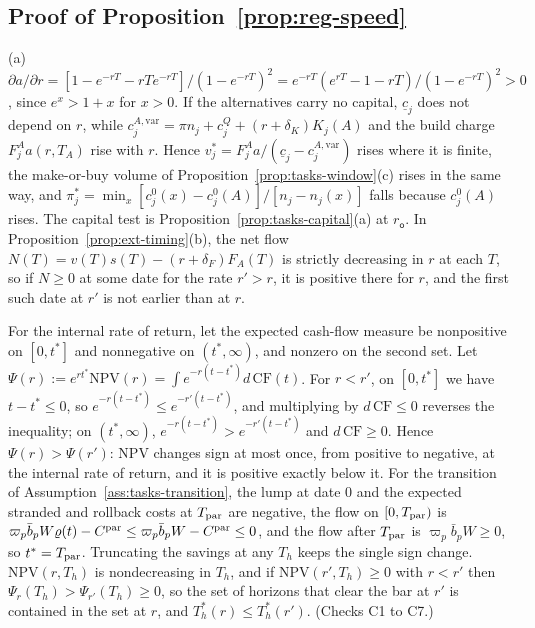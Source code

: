 \subsection*{Proof of Proposition~\ref{prop:reg-speed}}

(a) $\partial a/\partial r=[1-e^{-rT}-rTe^{-rT}]/(1-e^{-rT})^2=e^{-rT}(e^{rT}-1-rT)/(1-e^{-rT})^2>0$, since $e^x>1+x$ for $x>0$. If the alternatives carry no capital, $\underline c_j$ does not depend on $r$, while $c^{A,\mathrm{var}}_j=\pi n_j+c^Q_j+(r+\delta_K)K_j(A)$ and the build charge $F^A_ja(r,T_A)$ rise with $r$. Hence $v^*_j=F^A_ja/(\underline c_j-c^{A,\mathrm{var}}_j)$ rises where it is finite, the make-or-buy volume of Proposition~\ref{prop:tasks-window}(c) rises in the same way, and $\pi^*_j=\min_x[c^0_j(x)-c^0_j(A)]/[n_j-n_j(x)]$ falls because $c^0_j(A)$ rises. The capital test is Proposition~\ref{prop:tasks-capital}(a) at $r_{\mathsf o}$. In Proposition~\ref{prop:ext-timing}(b), the net flow $N(T)=v(T)s(T)-(r+\delta_F)F_A(T)$ is strictly decreasing in $r$ at each $T$, so if $N\ge0$ at some date for the rate $r'>r$, it is positive there for $r$, and the first such date at $r'$ is not earlier than at $r$.

For the internal rate of return, let the expected cash-flow measure be nonpositive on $[0,t^*]$ and nonnegative on $(t^*,\infty)$, and nonzero on the second set. Let $\Psi(r):=e^{rt^*}\mathrm{NPV}(r)=\int e^{-r(t-t^*)}d\,\mathrm{CF}(t)$. For $r<r'$, on $[0,t^*]$ we have $t-t^*\le0$, so $e^{-r(t-t^*)}\le e^{-r'(t-t^*)}$, and multiplying by $d\,\mathrm{CF}\le0$ reverses the inequality; on $(t^*,\infty)$, $e^{-r(t-t^*)}>e^{-r'(t-t^*)}$ and $d\,\mathrm{CF}\ge0$. Hence $\Psi(r)>\Psi(r')$: $\mathrm{NPV}$ changes sign at most once, from positive to negative, at the internal rate of return, and it is positive exactly below it. For the transition of Assumption~\ref{ass:tasks-transition}, the lump at date 0 and the expected stranded and rollback costs at $T_{\rm par}$ are negative, the flow on $[0,T_{\rm par})$ is $\varpi_p\bar b_pW\varrho(t)-C^{\rm par}\le\varpi_p\bar b_pW-C^{\rm par}\le0$, and the flow after $T_{\rm par}$ is $\varpi_p\bar b_pW\ge0$, so $t^*=T_{\rm par}$. Truncating the savings at any $T_h$ keeps the single sign change. $\mathrm{NPV}(r,T_h)$ is nondecreasing in $T_h$, and if $\mathrm{NPV}(r',T_h)\ge0$ with $r<r'$ then $\Psi_r(T_h)>\Psi_{r'}(T_h)\ge0$, so the set of horizons that clear the bar at $r'$ is contained in the set at $r$, and $T^*_h(r)\le T^*_h(r')$. (Checks C1 to C7.)

